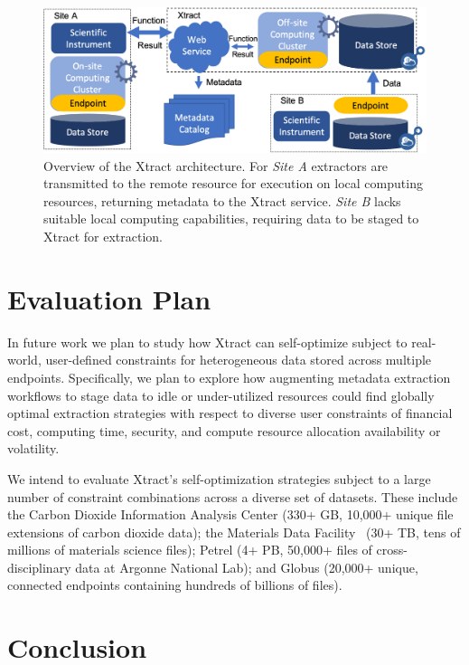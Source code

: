 \documentclass[sigconf, 9pt]{acmart}
\newcommand{\name}{Xtract}
\begin{document}
\begin{figure}[t]
	\centering
	\includegraphics[scale=0.35]{figs/updated-fig.png}
	\caption{Overview of the \name{} architecture. For \textit{Site A} extractors are transmitted to the remote resource for execution on local computing resources, returning metadata to the \name{} service. 
    \textit{Site B} lacks suitable local computing capabilities, requiring data to be staged to \name{} for extraction.}
	\label{fig:arch}
\end{figure}


\section{Evaluation Plan}
\label{sec:eval}

In future work we plan to study how \name{} can self-optimize subject to real-world, user-defined constraints for heterogeneous data stored across multiple 
endpoints.  Specifically, we plan to explore how augmenting metadata extraction workflows to stage data to idle or under-utilized resources could 
find globally optimal extraction strategies with respect to diverse user constraints of financial cost, computing time, security, and compute resource allocation 
availability or volatility.

We intend to evaluate \name{}'s self-optimization strategies subject to a large number of constraint combinations across a diverse set of datasets. 
These include the Carbon Dioxide Information Analysis Center (330+ GB, 10,000+ 
unique file extensions of carbon dioxide data); 
the Materials Data Facility~\cite{blaiszik2019mdf} (30+ TB, tens of millions of materials science files); 
Petrel (4+ PB, 50,000+ files of cross-disciplinary data at Argonne National Lab); 
and Globus (20,000+ unique, connected endpoints containing hundreds of billions of files).


\section{Conclusion}
\label{sec:conc}
\end{document}
